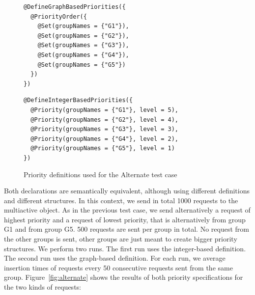 \documentclass[11pt]{report}
\begin{document}
\begin{figure}[!ht]
	\lstset{language=java, numbers=left, numberstyle=\tiny, stepnumber=1, numbersep=5pt, basicstyle=\footnotesize}
	\begin{minipage}{0.41\textwidth}
	\begin{lstlisting}[frame=single]
@DefineGraphBasedPriorities({
  @PriorityOrder({
    @Set(groupNames = {"G1"}),
    @Set(groupNames = {"G2"}),
    @Set(groupNames = {"G3"}),
    @Set(groupNames = {"G4"}),
    @Set(groupNames = {"G5"})
  })
})
 	\end{lstlisting}
 	\end{minipage}
 	\hfill
	\begin{minipage}{0.55\textwidth}
	\begin{lstlisting}[frame=single]
@DefineIntegerBasedPriorities({
  @Priority(groupNames = {"G1"}, level = 5),
  @Priority(groupNames = {"G2"}, level = 4),
  @Priority(groupNames = {"G3"}, level = 3),
  @Priority(groupNames = {"G4"}, level = 2),
  @Priority(groupNames = {"G5"}, level = 1)
})
 	\end{lstlisting}
 	\end{minipage}	
	\caption{Priority definitions used for the Alternate test case}
	\label{fig:alternate-decl}
\end{figure}

Both declarations are semantically equivalent, although using different definitions and different structures. In this context, we send in total 1000 requests to the multiactive object. As in the previous test case, we send alternatively a request of highest priority and a request of lowest priority, that is alternatively from group G1 and from group G5. 500 requests are sent per group in total. No request from the other groups is sent, other groups are just meant to create bigger priority structures. We perform two runs. The first run uses the integer-based definition. The second run uses the graph-based definition. For each run, we average insertion times of requests every 50 consecutive requests sent from the same group. Figure~\ref{fig:alternate} shows the results of both priority specifications for the two kinds of requests:
\end{document}

